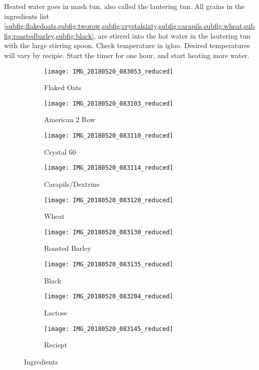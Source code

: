 Heated water goes in mash tun, also called the lautering tun.  All grains in the ingredients list \cref{subfig:flakedoats,subfig:tworow,subfig:crystalsixty,subfig:carapils,subfig:wheat,subfig:roastedbarley,subfig:black}, are stirred into the hot water in the lautering tun with the large stirring spoon. Check temperature in igloo. Desired temperatures will vary by recipie.  Start the timer for one hour, and start heating more water.

\begin{figure}[H]
\centering
\begin{subfigure}[b]{.245\textwidth}
  \texttt{[image: IMG\_20180520\_083053\_reduced]}
  \caption{Flaked Oats}\label{subfig:flakedoats}
\end{subfigure}
\begin{subfigure}[b]{.245\textwidth}
  \texttt{[image: IMG\_20180520\_083103\_reduced]}
  \caption{American 2 Row}\label{subfig:tworow}
\end{subfigure}
\begin{subfigure}[b]{.245\textwidth}
  \texttt{[image: IMG\_20180520\_083110\_reduced]}
  \caption{Crystal 60}\label{subfig:crystalsixty}
\end{subfigure}
\begin{subfigure}[b]{.245\textwidth}
  \texttt{[image: IMG\_20180520\_083114\_reduced]}
  \caption{Carapils/Dextrine}\label{subfig:carapils}
\end{subfigure}

\begin{subfigure}[b]{.245\textwidth}
  \texttt{[image: IMG\_20180520\_083120\_reduced]}
  \caption{Wheat}\label{subfig:wheat}
\end{subfigure}
\begin{subfigure}[b]{.245\textwidth}
  \texttt{[image: IMG\_20180520\_083130\_reduced]}
  \caption{Roasted Barley}\label{subfig:roastedbarley}
\end{subfigure}
\begin{subfigure}[b]{.245\textwidth}
  \texttt{[image: IMG\_20180520\_083135\_reduced]}
  \caption{Black}\label{subfig:black}
\end{subfigure}

\begin{subfigure}[b]{.245\textwidth}
  \texttt{[image: IMG\_20180520\_083204\_reduced]}
  \caption{Lactose}\label{subfig:lactose}
\end{subfigure}
\begin{subfigure}[b]{.245\textwidth}
  \texttt{[image: IMG\_20180520\_083145\_reduced]}
  \caption{Reciept}\label{subfig:receipt}
\end{subfigure}
\caption{Ingredients}\label{subfig:ingredients}
\end{figure}

